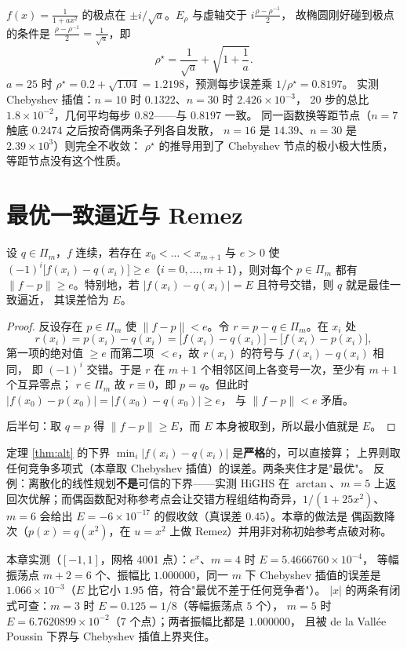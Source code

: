 \begin{example}
$f(x)=\frac1{1+ax^2}$ 的极点在 $\pm i/\sqrt a$。$E_\rho$ 与虚轴交于 $i\frac{\rho-\rho^{-1}}2$，
故椭圆刚好碰到极点的条件是 $\frac{\rho-\rho^{-1}}2=\frac1{\sqrt a}$，即
\[
  \rho^\star=\frac1{\sqrt a}+\sqrt{1+\frac1a}.
\]
$a=25$ 时 $\rho^\star=0.2+\sqrt{1.04}=1.2198$，预测每步误差乘 $1/\rho^\star=0.8197$。
实测 Chebyshev 插值：$n=10$ 时 $0.1322$、$n=30$ 时 $2.426\times10^{-3}$，
20 步的总比 $1.8\times10^{-2}$，几何平均每步 $0.82$——与 $0.8197$ 一致。
同一函数换等距节点（$n=7$ 触底 $0.2474$ 之后按奇偶两条子列各自发散，
$n=16$ 是 $14.39$、$n=30$ 是 $2.39\times10^{3}$）则完全不收敛：
$\rho^\star$ 的推导用到了 Chebyshev 节点的极小极大性质，等距节点没有这个性质。
\end{example}

\section{最优一致逼近与 Remez}

\begin{theorem}
\label{thm:alt}
设 $q\in\Pi_m$，$f$ 连续，若存在 $x_0<\dots<x_{m+1}$ 与 $e>0$ 使
$(-1)^i\bigl[f(x_i)-q(x_i)\bigr]\ge e$（$i=0,\dots,m+1$），则对每个 $p\in\Pi_m$
都有 $\|f-p\|\ge e$。特别地，若 $|f(x_i)-q(x_i)|=E$ 且符号交错，则 $q$ 就是最佳一致逼近，
其误差恰为 $E$。
\end{theorem}

\begin{proof}
反设存在 $p\in\Pi_m$ 使 $\|f-p\|<e$。令 $r=p-q\in\Pi_m$。在 $x_i$ 处
\[
  r(x_i)=p(x_i)-q(x_i)=\bigl[f(x_i)-q(x_i)\bigr]-\bigl[f(x_i)-p(x_i)\bigr],
\]
第一项的绝对值 $\ge e$ 而第二项 $<e$，故 $r(x_i)$ 的符号与 $f(x_i)-q(x_i)$ 相同，
即 $(-1)^i$ 交错。于是 $r$ 在 $m+1$ 个相邻区间上各变号一次，至少有 $m+1$ 个互异零点；
$r\in\Pi_m$ 故 $r\equiv0$，即 $p=q$。但此时 $|f(x_0)-p(x_0)|=|f(x_0)-q(x_0)|\ge e$，
与 $\|f-p\|<e$ 矛盾。

后半句：取 $q=p$ 得 $\|f-p\|\ge E$，而 $E$ 本身被取到，所以最小值就是 $E$。
\end{proof}

\begin{remark}
定理 \ref{thm:alt} 的下界 $\min_i|f(x_i)-q(x_i)|$ 是\textbf{严格}的，可以直接算；
上界则取任何竞争多项式（本章取 Chebyshev 插值）的误差。两条夹住才是"最优"。
反例：离散化的线性规划\textbf{不是}可信的下界——实测 HiGHS 在 $\arctan$、$m=5$
上返回次优解；而偶函数配对称参考点会让交错方程组结构奇异，$1/(1+25x^2)$、$m=6$
会给出 $E=-6\times10^{-17}$ 的假收敛（真误差 $0.45$）。本章的做法是
偶函数降次（$p(x)=q(x^2)$，在 $u=x^2$ 上做 Remez）并用非对称初始参考点破对称。

本章实测（$[{-1},1]$，网格 4001 点）：$e^x$、$m=4$ 时 $E=5.4666760\times10^{-4}$，
等幅振荡点 $m+2=6$ 个、振幅比 $1.000000$，同一 $m$ 下 Chebyshev 插值的误差是
$1.066\times10^{-3}$（$E$ 比它小 $1.95$ 倍，符合"最优不差于任何竞争者"）。
$|x|$ 的两条有闭式可查：$m=3$ 时 $E=0.125=1/8$（等幅振荡点 $5$ 个），
$m=5$ 时 $E=6.7620899\times10^{-2}$（$7$ 个点）；两者振幅比都是 $1.000000$，
且被 de la Vall\'ee Poussin 下界与 Chebyshev 插值上界夹住。
\end{remark}

